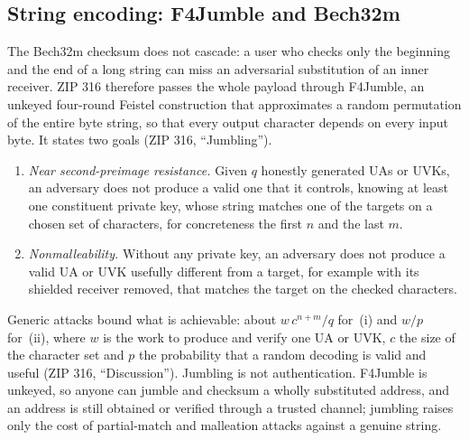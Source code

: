 \documentclass[11pt,a4paper]{article}
\theoremstyle{definition}
\begin{document}
\subsection{String encoding: F4Jumble and Bech32m}\label{sec:addr-string}

The Bech32m checksum does not cascade: a user who checks only the beginning
and the end of a long string can miss an adversarial substitution of an
inner receiver. ZIP 316 therefore passes the whole payload through F4Jumble,
an unkeyed four-round Feistel construction that approximates a random
permutation of the entire byte string, so that every output character
depends on every input byte. It states two goals (ZIP 316, ``Jumbling'').
\begin{enumerate}[label=(\roman*)]
\item \emph{Near second-preimage resistance.} Given $q$ honestly generated
  UAs or UVKs, an adversary does not produce a valid one that it controls,
  knowing at least one constituent private key, whose string matches one
  of the targets on a chosen set of characters, for concreteness the first
  $n$ and the last $m$.
\item \emph{Nonmalleability.} Without any private key, an adversary does
  not produce a valid UA or UVK usefully different from a target, for
  example with its shielded receiver removed, that matches the target on
  the checked characters.
\end{enumerate}
Generic attacks bound what is achievable: about $w\,c^{n+m}/q$ for~(i) and
$w/p$ for~(ii), where $w$ is the work to produce and verify one UA or UVK,
$c$ the size of the character set and $p$ the probability that a random
decoding is valid and useful (ZIP 316, ``Discussion''). Jumbling is not
authentication. F4Jumble is unkeyed, so anyone can jumble and checksum a
wholly substituted address, and an address is still obtained or verified
through a trusted channel; jumbling raises only the cost of partial-match
and malleation attacks against a genuine string.
\end{document}
